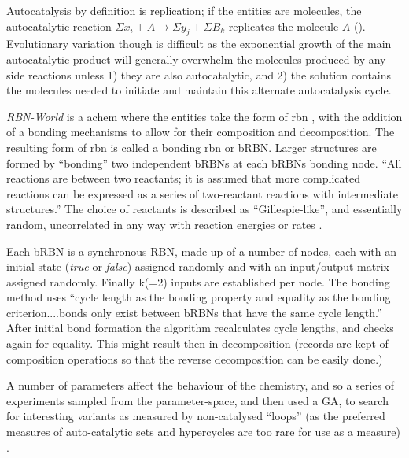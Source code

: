 Autocatalysis by definition is replication; if the entities are molecules, the autocatalytic reaction $\Sigma x_i + A\rightarrow \Sigma y_j + \Sigma B_k$ replicates the molecule $A$ (\eg \textcite{Lifson1997}). Evolutionary variation though is difficult as the exponential growth of the main autocatalytic product will generally overwhelm the molecules produced by any side reactions unless 1) they are also autocatalytic, and 2) the solution contains the molecules needed to initiate and maintain this alternate autocatalysis cycle.


\emph{RBN-World} \parencite{Faulconbridge2011} is a \gls{achem} where the entities take the form of \gls{rbn} \parencite{Kauffman:1969ne}, with the addition of a bonding mechanisms to allow for their composition and decomposition. The resulting form of \gls{rbn} is called a bonding \gls{rbn} or bRBN.  Larger structures are formed by ``bonding'' two independent bRBNs at each bRBNs bonding node. ``All reactions are between two reactants; it is assumed that more complicated reactions can be expressed as a series of two-reactant reactions with intermediate structures.'' The choice of reactants is described as ``Gillespie-like'', and essentially random, uncorrelated in any way with reaction energies or rates \parencite[chap.8]{Faulconbridge2011}.

Each bRBN is a synchronous RBN, made up of a number of nodes, each with an initial state (\emph{true} or \emph{false}) assigned randomly and with an input/output matrix assigned randomly. Finally k(=2) inputs are established per node. The bonding method uses ``cycle length as the bonding property and equality as the bonding criterion....bonds only exist between bRBNs that have the same cycle length.'' After initial bond formation the algorithm recalculates cycle lengths, and checks again for equality. This might result then in decomposition (records are kept of composition operations so that the reverse decomposition can be easily done.)

A number of parameters affect the behaviour of the chemistry, and so a series of experiments sampled from the parameter-space, and then used a GA, to search for interesting variants as measured by non-catalysed ``loops'' (as the preferred measures of auto-catalytic sets and \glspl{hypercycle} are too rare for use as a measure) \parencite[chap.8]{Faulconbridge2011}. 


